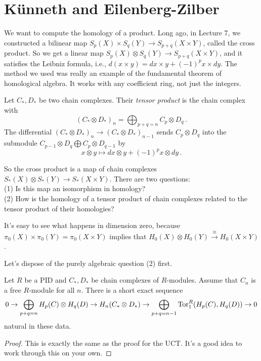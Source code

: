 \section{K\"{u}nneth and Eilenberg-Zilber}
We want to compute the homology of a product. Long ago, in Lecture 7, we constructed a bilinear map $S_p(X)\times S_q(Y)\to S_{p+q}(X\times Y)$, called the cross product. So we get a linear map $S_p(X)\otimes S_q(Y)\to S_{p+q}(X\times Y)$, and it satisfies the Leibniz formula, i.e., $d(x\times y)=dx\times y+(-1)^px\times dy$. The method we used was really an example of the fundamental theorem of homological algebra. It works with any coefficient ring, not just the integers. 
\begin{definition}
Let $C_\ast,D_\ast$ be two chain complexes. Their {\em tensor product} is 
the chain complex with
\[
(C_\ast\otimes D_\ast)_n=\bigoplus_{p+q=n}C_p\otimes D_q\,.
\]
The differential $(C_\ast\otimes D_\ast)_n\to (C_\ast\otimes D_\ast)_{n-1}$ sends $C_p\otimes D_q$ into the submodule $C_{p-1}\otimes D_q\bigoplus C_p\otimes D_{q-1}$ by 
\[
x\otimes y\mapsto dx\otimes y+(-1)^p x\otimes dy\,.
\]
\end{definition}
So the cross product is a map of chain complexes $S_\ast(X)\otimes S_\ast(Y)\to S_\ast(X\times Y)$. There are two questions:\\
(1) Is this map an isomorphism in homology? \\
(2) How is the homology of a tensor product of chain complexes related to the
tensor product of their homologies? 

It's easy to see what happens in dimension zero, because 
$\pi_0(X)\times \pi_0(Y)=\pi_0(X\times Y)$
implies that 
$H_0(X)\otimes H_0(Y)\xrightarrow{\cong}H_0(X\times Y)$.

Let's dispose of the purely algebraic question (2) first. 

\begin{theorem}
Let $R$ be a PID and $C_\ast,D_\ast$ be chain complexes of $R$-modules. 
Assume that $C_n$ is a free $R$-module for all $n$. There is a short
exact sequence
\begin{equation*}
0\to\bigoplus_{p+q=n} H_p(C)\otimes H_q(D)\to H_n(C_\ast\otimes D_\ast)
\to \bigoplus_{p+q=n-1}\operatorname{Tor}^R_1( H_p(C), H_q(D))\to 0
\end{equation*}
natural in these data.
\end{theorem}
\begin{proof}
This is exactly the same as the proof for the UCT. It's a good idea to work through this on your own.
\end{proof}

